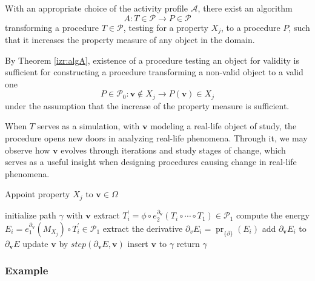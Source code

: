 \documentclass[smallcondensed]{svjour3}
\newcommand{\vv}{\mathbf{v}}
\newcommand{\dP}{\mathcal{P}}
\newcommand{\D}{\partial}
\DeclareMathOperator{\proj}{pr}
\begin{document}
      \begin{theorem}\label{izr:algA}
           With an appropriate choice of the activity profile $\mathcal{A}$, there exist an algorithm
           \begin{equation}\label{eq:algA1}
             A:T\in\dP\to P\in\dP
             \end{equation}
             transforming a procedure $T\in\dP$, testing for a property $X_j$, to a procedure $P$, such that it increases the property measure of any object in the domain. 
           \end{theorem}
           \begin{corollary}
              By Theorem \ref{izr:algA}, existence of a procedure testing an object for validity is sufficient for constructing a procedure transforming a non-valid object to a valid one
              $$P\in \dP_0:\vv\notin X_j\to P(\vv)\in X_j$$
              under the assumption that the increase of the property measure is sufficient.
              \end{corollary}
              
    When $T$ serves as a simulation, with $\vv$ modeling a real-life object of study, the procedure opens new doors in analyzing real-life phenomena. Through it, we may observe how $\vv$ evolves through iterations and study stages of change, which serves as a useful insight when designing procedures causing change in real-life phenomena.          
   
   \begin{algorithm}[H]
   \caption{Appoint property $X_j$ to $\vv\in \Omega$}
   \label{alg:appoint}
   \begin{algorithmic}[1]
   \Procedure{Appoint property $X_j$ to $\vv\in \Omega$}{}
   \State initialize path $\gamma$ with $\vv$
   \State extract $T^\prime_i=\phi\circ e^{\D_{\vv}}_2(T_i\circ\cdots\circ T_1)\in\dP_1$
   \State compute the energy $E_i=e^{\D_\vv}_1(M_{X_j})\circ T^\prime_i\in\dP_1$
   \State extract the derivative $\D_v E_i=\proj_{\{\D\}}(E_i)$
   \State add $\D_\vv E_i$ to $\D_\vv E$
   \EndFor
   \State update $\vv$ by $step(\D_\vv E,\vv)$
   \State insert $\vv$ to $\gamma$
   \EndFor
   \State return $\gamma$
   \EndProcedure
   \end{algorithmic}
   \end{algorithm}

   
   \subsubsection{Example}
   
\end{document}
